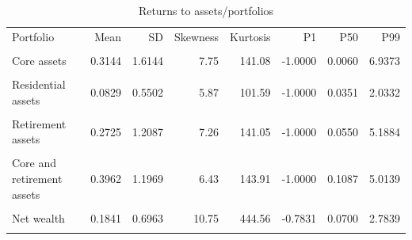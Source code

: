 \begin{table}[htbp]\centering\small
\caption{Returns to assets/portfolios}
\label{tab:returns_portfolio_moments_pooled}
\begin{tabular}{lrrrrrrr}\toprule
Portfolio & Mean & SD & Skewness & Kurtosis & P1 & P50 & P99 \\\\ \midrule
Core assets & 0.3144 & 1.6144 & 7.75 & 141.08 & -1.0000 & 0.0060 & 6.9373 \\\\
Residential assets & 0.0829 & 0.5502 & 5.87 & 101.59 & -1.0000 & 0.0351 & 2.0332 \\\\
Retirement assets & 0.2725 & 1.2087 & 7.26 & 141.05 & -1.0000 & 0.0550 & 5.1884 \\\\
\addlinespace
Core and retirement assets & 0.3962 & 1.1969 & 6.43 & 143.91 & -1.0000 & 0.1087 & 5.0139 \\\\
Net wealth & 0.1841 & 0.6963 & 10.75 & 444.56 & -0.7831 & 0.0700 & 2.7839 \\\\
\bottomrule
\end{tabular}
\end{table}
